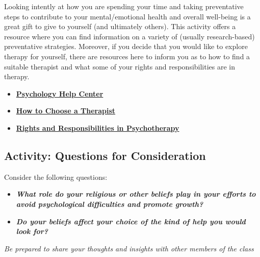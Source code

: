 \documentclass[
]{book}
\providecommand{\tightlist}{%
  \setlength{\itemsep}{0pt}\setlength{\parskip}{0pt}}
\begin{document}
\begin{reflect}
Looking intently at how you are spending your time and taking preventative steps to contribute to your mental/emotional health and overall well-being is a great gift to give to yourself (and ultimately others). This activity offers a resource where you can find information on a variety of (usually research-based) preventative strategies. Moreover, if you decide that you would like to explore therapy for yourself, there are resources here to inform you as to how to find a suitable therapist and what some of your rights and responsibilities are in therapy.

\begin{itemize}
\tightlist
\item
  \href{https://www.apa.org/helpcenter/}{\textbf{Psychology Help Center}}\\
\item
  \href{http://psychcentral.com/therapst.htm}{\textbf{How to Choose a Therapist}}\\
\item
  \href{https://psychcentral.com/blog/your-patient-rights-in-therapy\#1}{\textbf{Rights and Responsibilities in Psychotherapy}}
\end{itemize}
\end{reflect}

\hypertarget{activity-questions-for-consideration-19}{%
\subsection*{Activity: Questions for Consideration}\label{activity-questions-for-consideration-19}}

\begin{reflect}
Consider the following questions:

\begin{itemize}
\tightlist
\item
  \textbf{\emph{What role do your religious or other beliefs play in your efforts to avoid psychological difficulties and promote growth?}}
\item
  \textbf{\emph{Do your beliefs affect your choice of the kind of help you would look for?}}
\end{itemize}

\emph{Be prepared to share your thoughts and insights with other members of the class}
\end{reflect}
\end{document}
